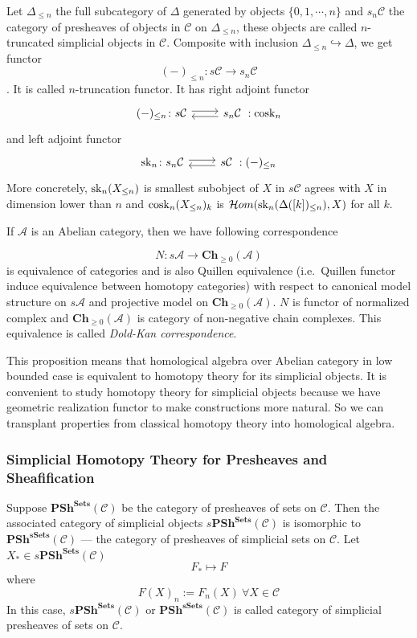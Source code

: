 \documentclass[b5paper,10pt]{article}
\begin{document}
Let $\Delta_{\leq n}$ the full subcategory of $\Delta$ generated by objects $\{0,1, \cdots, n \}$ and $s_n \mathcal{C}$ the category of presheaves of objects in $\mathcal{C}$ on $\Delta_{\leq n}$, these objects are called $n$-truncated simplicial objects in $\mathcal{C}$. Composite with inclusion $\Delta_{\leq n} \hookrightarrow \Delta$, we get functor
\[
(-)_{\leq n} \colon s\mathcal{C} \to s_n \mathcal{C}
\]
. It is called $n$-truncation functor. It has right adjoint functor 
\[
\begin{tikzcd}
(-)_{\leq n} \colon s\mathcal{C} \ar[r, shift left = 1] \ar[r, leftarrow, shift right =1]& s_n \mathcal{C}\ :\cosk_n
\end{tikzcd}
\]
and left adjoint functor 
\[
\begin{tikzcd}
\sk_n \colon s_n\mathcal{C} \arrow[r, shift left =1] \arrow[r, leftarrow, shift right=1]& s\mathcal{C}\ : (-)_{\leq n}
\end{tikzcd}
\]
More concretely, $\operatorname{sk}_n(X_{\leq n})$ is smallest subobject of $X$ in $s\mathcal{C}$ agrees with $X$ in dimension lower than $n$ and $\operatorname{cosk}_n(X_{\leq n})_k$ is $\mathcal{H}om(\operatorname{sk}_n(\Delta([k])_{\leq n}),X) $ for all $k$.

If $\mathcal{A}$ is  an Abelian category, then we have following correspondence
\begin{secprop}
\[
N \colon s\mathcal{A} \to \mathbf{Ch}_{\geq 0} (\mathcal{A})
\]
is equivalence of categories and is also Quillen equivalence (i.e.\ Quillen functor induce equivalence between homotopy categories) with respect to canonical model structure on $s\mathcal{A}$ and projective model on $\mathbf{Ch}_{\geq 0 } (\mathcal{A})$. $N$ is functor of normalized complex and $\mathbf{Ch}_{\geq 0}(\mathcal{A})$ is category of non-negative chain complexes. This equivalence is called \emph{Dold-Kan correspondence}.
\end{secprop}
This proposition means that homological algebra over Abelian category in low bounded case is equivalent to homotopy theory for its simplicial objects. It is convenient to study homotopy theory for simplicial objects because we have geometric realization functor to make constructions more natural. So we can transplant properties from classical homotopy theory into homological algebra.
\subsubsection{Simplicial Homotopy Theory for Presheaves and Sheafification}
Suppose $\mathbf{PSh}^{\mathbf{Sets}}(\mathcal{C})$ be the category of presheaves of sets on $\mathcal{C}$. Then the associated category of simplicial objects $s\mathbf{PSh^{Sets}}(\mathcal{C})$ is isomorphic to $\mathbf{PSh^{sSets}}(\mathcal{C})$ --- the category of presheaves of simplicial sets on $\mathcal{C}$. Let $X_* \in s\mathbf{PSh^{Sets}}(\mathcal{C})$
\[
F_* \mapsto F
\]
where \[
F(X)_n := F_n(X) \ \forall X \in \mathcal{C}
\]
In this case, $s\mathbf{PSh^{Sets}}(\mathcal{C})$ or $\mathbf{PSh^{sSets}}(\mathcal{C})$ is called category of simplicial presheaves of sets on $\mathcal{C}$.
\end{document}
